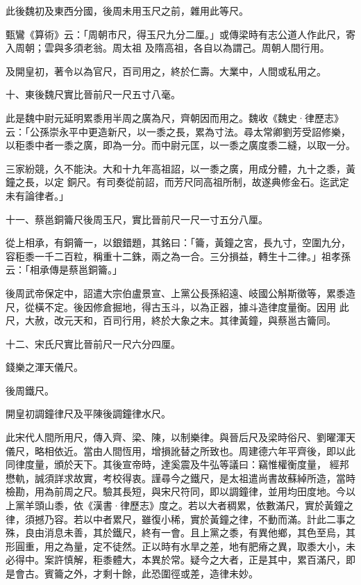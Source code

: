 \begin{pinyinscope}
 此後魏初及東西分國，後周未用玉尺之前，雜用此等尺。



 甄鸞《算術》云：「周朝市尺，得玉尺九分二厘。」或傳梁時有志公道人作此尺，寄入周朝；雲與多須老翁。周太祖
 及隋高祖，各自以為謂己。周朝人間行用。



 及開皇初，著令以為官尺，百司用之，終於仁壽。大業中，人間或私用之。



 十、東後魏尺實比晉前尺一尺五寸八毫。



 此是魏中尉元延明累黍用半周之廣為尺，齊朝因而用之。魏收《魏史·律歷志》云：「公孫崇永平中更造新尺，以一黍之長，累為寸法。尋太常卿劉芳受詔修樂，以秬黍中者一黍之廣，即為一分。而中尉元匡，以一黍之廣度黍二縫，以取一分。



 三家紛競，久不能決。大和十九年高祖詔，以一黍之廣，用成分體，九十之黍，黃鐘之長，以定
 銅尺。有司奏從前詔，而芳尺同高祖所制，故遂典修金石。迄武定未有論律者。」



 十一、蔡邕銅籥尺後周玉尺，實比晉前尺一尺一寸五分八厘。



 從上相承，有銅籥一，以銀錯題，其銘曰：「籥，黃鐘之宮，長九寸，空圍九分，容秬黍一千二百粒，稱重十二銖，兩之為一合。三分損益，轉生十二律。」祖孝孫云：「相承傳是蔡邕銅籥。」



 後周武帝保定中，詔遣大宗伯盧景宣、上黨公長孫紹遠、岐國公斛斯徵等，累黍造尺，從橫不定。後因修倉掘地，得古玉斗，以為正器，據斗造律度量衡。因用
 此尺，大赦，改元天和，百司行用，終於大象之末。其律黃鐘，與蔡邕古籥同。



 十二、宋氏尺實比晉前尺一尺六分四厘。



 錢樂之渾天儀尺。



 後周鐵尺。



 開皇初調鐘律尺及平陳後調鐘律水尺。



 此宋代人間所用尺，傳入齊、梁、陳，以制樂律。與晉后尺及梁時俗尺、劉曜渾天儀尺，略相依近。當由人間恆用，增損訛替之所致也。周建德六年平齊後，即以此同律度量，頒於天下。其後宣帝時，達奚震及牛弘等議曰：竊惟權衡度量，
 經邦懋軌，誠須詳求故實，考校得衷。謹尋今之鐵尺，是太祖遣尚書故蘇綽所造，當時檢勘，用為前周之尺。驗其長短，與宋尺符同，即以調鐘律，並用均田度地。今以上黨羊頭山黍，依《漢書·律歷志》度之。若以大者稠累，依數滿尺，實於黃鐘之律，須撼乃容。若以中者累尺，雖復小稀，實於黃鐘之律，不動而滿。計此二事之殊，良由消息未善，其於鐵尺，終有一會。且上黨之黍，有異他鄉，其色至烏，其形圓重，用之為量，定不徒然。正以時有水旱之差，地有肥瘠之異，取黍大小，未必得中。案許慎解，秬黍體大，本異於常。疑今之大者，正是其中，累百滿尺，即
 是會古。賓籥之外，才剩十餘，此恐圍徑或差，造律未妙。




\end{pinyinscope}
